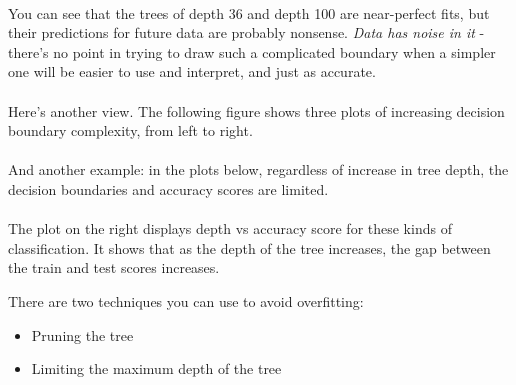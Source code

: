 \documentclass[10pt,a4paper]{report}
\begin{document}
\paragraph{}You can see that the trees of depth 36 and depth 100 are near-perfect fits, but their predictions for future data are probably nonsense. \textit{Data has noise in it} - there's no point in trying to draw such a complicated boundary when a simpler one will be easier to use and interpret, and just as accurate.
\paragraph{}Here's another view. The following figure shows three plots of increasing decision boundary complexity, from left to right.\\
\paragraph{}And another example: in the plots below, regardless of increase in tree depth, the decision boundaries and accuracy scores are limited.
\paragraph{}
\paragraph{}The plot on the right displays depth vs accuracy score for these kinds of classification. It shows that as the depth of the tree increases, the gap between the train and test scores increases.
\begin{center}
\end{center}
There are two techniques you can use to avoid overfitting:
\begin{itemize}
\item Pruning the tree
\item Limiting the maximum depth of the tree
\end{itemize}
\end{document}
